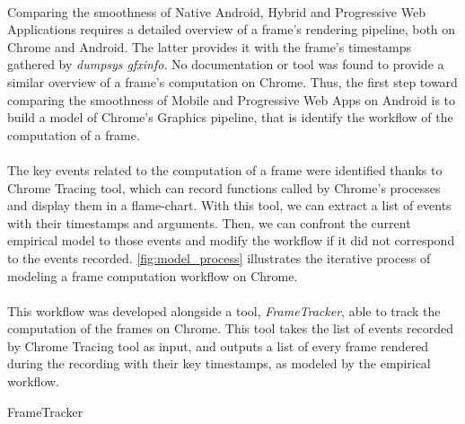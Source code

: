     \paragraph{}
    Comparing the smoothness of Native Android, Hybrid and Progressive Web Applications requires a detailed overview of a frame's rendering pipeline, both on Chrome and Android. The latter provides it with the frame's timestamps gathered by \textit{dumpsys gfxinfo}. No documentation or tool was found to provide a similar overview of a frame's computation on Chrome. Thus, the first step toward comparing the smoothness of Mobile and Progressive Web Apps on Android is to build a model of Chrome's Graphics pipeline, that is identify the workflow of the computation of a frame. 
    
    \paragraph{}
    The key events related to the computation of a frame were identified thanks to Chrome Tracing tool, which can record functions called by Chrome's processes and display them in a flame-chart. With this tool, we can extract a list of events with their timestamps and arguments. Then, we can confront the current empirical model to those events and modify the workflow if it did not correspond to the events recorded. \autoref{fig:model_process} illustrates the iterative process of modeling a frame computation workflow on Chrome.
    
    \paragraph{}
    This workflow was developed alongside a tool, \textit{FrameTracker}, able to track the computation of the frames on Chrome. This tool takes the list of events recorded by Chrome Tracing tool as input, and outputs a list of every frame rendered during the recording with their key timestamps, as modeled by the empirical workflow. 


    \begin{algorithm}
        \SetAlgoLined
        \caption{FrameTracker}
        \label{alg:frametracker}
    \end{algorithm}

